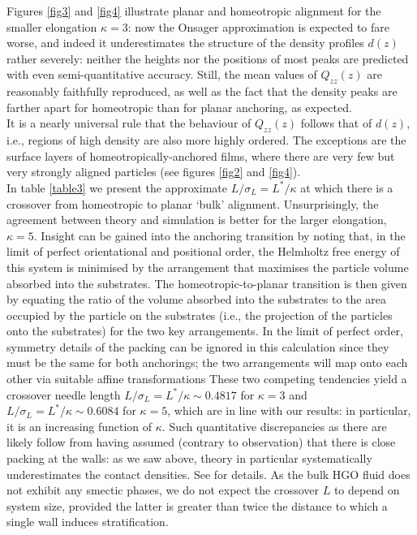 \documentclass[aps,pre,twocolumn,groupedaddress,showpacs]{revtex4}
\begin{document}
Figures \ref{fig3} and \ref{fig4} illustrate planar and homeotropic alignment 
for the smaller elongation $\kappa=3$: now the Onsager approximation is 
expected to fare worse, and indeed it underestimates the structure of the
density profiles $d(z)$ rather severely: neither the heights nor the positions 
of most peaks are predicted with even semi-quantitative accuracy. Still, the 
mean values of $Q_{zz}(z)$ are reasonably faithfully reproduced, as well as
the fact that the density peaks are farther apart for homeotropic than for
planar anchoring, as expected.\\
It is a nearly universal rule that the behaviour of $Q_{zz}(z)$ follows that
of $d(z)$, i.e., regions of high density are also more highly ordered. The
exceptions are the surface layers of homeotropically-anchored films, where 
there are very few but very strongly aligned particles (see figures \ref{fig2}
and \ref{fig4}).\\
In table \ref{table3} we present the approximate $L/\sigma_L=L^*/\kappa$ at
which there is a crossover from homeotropic to planar `bulk' alignment. 
Unsurprisingly, the agreement between theory and simulation is better for
the larger elongation, $\kappa=5$. 
Insight can be gained into the anchoring transition by noting that, 
in the limit of perfect orientational and positional order, the
Helmholtz free energy of this system is minimised by the arrangement 
that maximises the particle volume absorbed into the substrates. The
homeotropic-to-planar transition is then given by equating the ratio 
of the volume absorbed into the substrates to the area occupied by the
particle on the substrates (i.e., the projection of the particles onto 
the substrates) for the two key arrangements. In the limit of perfect
order, symmetry details of the packing can be ignored in this calculation 
since they must be the same for both anchorings; the two arrangements 
will map onto each other via suitable affine transformations
These two competing tendencies yield a crossover needle 
length $L/\sigma_L=L^*/\kappa\sim 0.4817$ for $\kappa=3$ and 
$L/\sigma_L=L^*/\kappa\sim 0.6084$ for $\kappa=5$, which are in line with 
our results: in particular, it is an increasing function of $\kappa$. Such 
quantitative discrepancies as there are likely follow from having assumed 
(contrary to observation) that there is close packing at the walls: as we
saw above, theory in particular systematically underestimates the contact 
densities. See \cite{Barmes:2003} for details. As the bulk HGO fluid does
not exhibit any smectic phases, we do not expect the crossover $L$ to depend
on system size, provided the latter is greater than twice the distance to 
which a single wall induces stratification.\\
\end{document}

